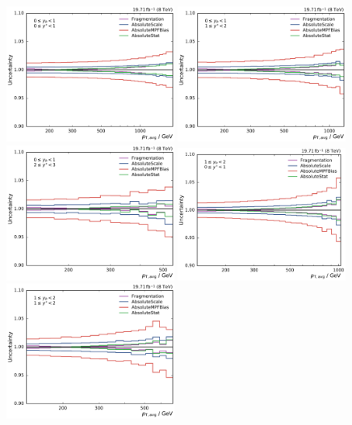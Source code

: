 \begin{figure}[htbp]
    \centering
    \includegraphics[width=0.49\textwidth]{figures/measurement/jec_relunc_0_yb0ys0.pdf}\hfill
    \includegraphics[width=0.49\textwidth]{figures/measurement/jec_relunc_0_yb0ys1.pdf}
    \includegraphics[width=0.49\textwidth]{figures/measurement/jec_relunc_0_yb0ys2.pdf}\hfill
    \includegraphics[width=0.49\textwidth]{figures/measurement/jec_relunc_0_yb1ys0.pdf}
    \includegraphics[width=0.49\textwidth]{figures/measurement/jec_relunc_0_yb1ys1.pdf}\hfill

\end{figure}
